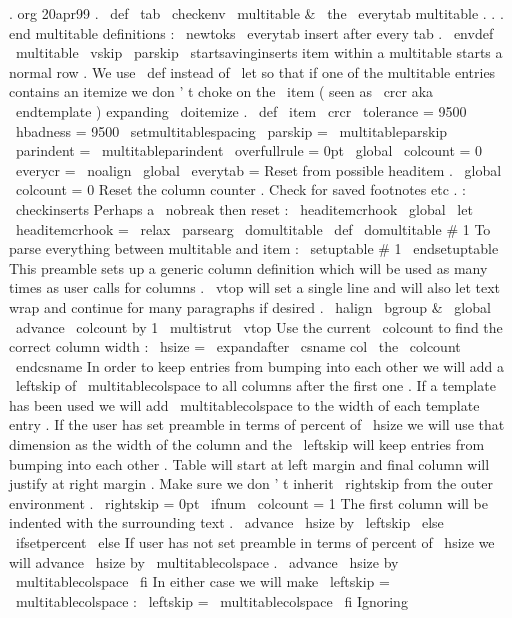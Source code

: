 {{{{.
org
20apr99
.
\
def
\
tab
{
\
checkenv
\
multitable
&
\
the
\
everytab
}
%
%
multitable
.
.
.
end
multitable
definitions
:
%
\
newtoks
\
everytab
%
insert
after
every
tab
.
%
\
envdef
\
multitable
{
%
\
vskip
\
parskip
\
startsavinginserts
%
%
item
within
a
multitable
starts
a
normal
row
.
%
We
use
\
def
instead
of
\
let
so
that
if
one
of
the
multitable
entries
%
contains
an
itemize
we
don
'
t
choke
on
the
\
item
(
seen
as
\
crcr
aka
%
\
endtemplate
)
expanding
\
doitemize
.
\
def
\
item
{
\
crcr
}
%
%
\
tolerance
=
9500
\
hbadness
=
9500
\
setmultitablespacing
\
parskip
=
\
multitableparskip
\
parindent
=
\
multitableparindent
\
overfullrule
=
0pt
\
global
\
colcount
=
0
%
\
everycr
=
{
%
\
noalign
{
%
\
global
\
everytab
=
{
}
%
Reset
from
possible
headitem
.
\
global
\
colcount
=
0
%
Reset
the
column
counter
.
%
%
Check
for
saved
footnotes
etc
.
:
\
checkinserts
%
%
Perhaps
a
\
nobreak
then
reset
:
\
headitemcrhook
\
global
\
let
\
headitemcrhook
=
\
relax
}
%
}
%
%
\
parsearg
\
domultitable
}
\
def
\
domultitable
#
1
{
%
%
To
parse
everything
between
multitable
and
item
:
\
setuptable
#
1
\
endsetuptable
%
%
This
preamble
sets
up
a
generic
column
definition
which
will
%
be
used
as
many
times
as
user
calls
for
columns
.
%
\
vtop
will
set
a
single
line
and
will
also
let
text
wrap
and
%
continue
for
many
paragraphs
if
desired
.
\
halign
\
bgroup
&
%
\
global
\
advance
\
colcount
by
1
\
multistrut
\
vtop
{
%
%
Use
the
current
\
colcount
to
find
the
correct
column
width
:
\
hsize
=
\
expandafter
\
csname
col
\
the
\
colcount
\
endcsname
%
%
In
order
to
keep
entries
from
bumping
into
each
other
%
we
will
add
a
\
leftskip
of
\
multitablecolspace
to
all
columns
after
%
the
first
one
.
%
%
If
a
template
has
been
used
we
will
add
\
multitablecolspace
%
to
the
width
of
each
template
entry
.
%
%
If
the
user
has
set
preamble
in
terms
of
percent
of
\
hsize
we
will
%
use
that
dimension
as
the
width
of
the
column
and
the
\
leftskip
%
will
keep
entries
from
bumping
into
each
other
.
Table
will
start
at
%
left
margin
and
final
column
will
justify
at
right
margin
.
%
%
Make
sure
we
don
'
t
inherit
\
rightskip
from
the
outer
environment
.
\
rightskip
=
0pt
\
ifnum
\
colcount
=
1
%
The
first
column
will
be
indented
with
the
surrounding
text
.
\
advance
\
hsize
by
\
leftskip
\
else
\
ifsetpercent
\
else
%
If
user
has
not
set
preamble
in
terms
of
percent
of
\
hsize
%
we
will
advance
\
hsize
by
\
multitablecolspace
.
\
advance
\
hsize
by
\
multitablecolspace
\
fi
%
In
either
case
we
will
make
\
leftskip
=
\
multitablecolspace
:
\
leftskip
=
\
multitablecolspace
\
fi
%
Ignoring
}}}}}}
